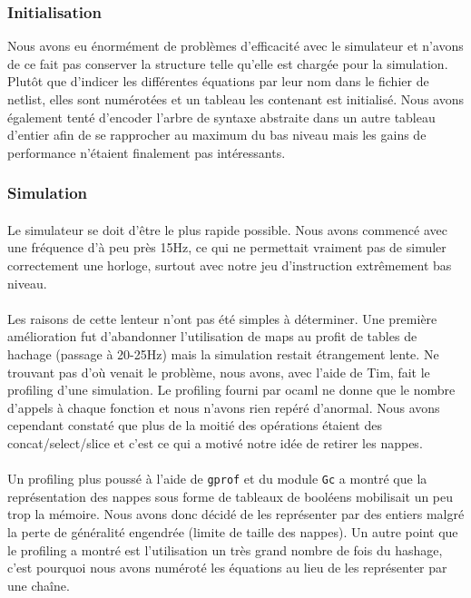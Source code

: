 \documentclass{article}
\begin{document}
\subsubsection{Initialisation}
Nous avons eu énormément de problèmes d'efficacité avec le simulateur et n'avons de ce fait pas conserver la structure telle qu'elle est chargée pour la simulation. Plutôt que d'indicer les différentes équations par leur nom dans le fichier de netlist, elles sont numérotées et un tableau les contenant est initialisé. Nous avons également tenté d'encoder l'arbre de syntaxe abstraite dans un autre tableau d'entier afin de se rapprocher au maximum du bas niveau mais les gains de performance n'étaient finalement pas intéressants.

\subsubsection{Simulation}
\paragraph{}Le simulateur se doit d'être le plus rapide possible. Nous avons commencé avec une fréquence d'à peu près 15Hz, ce qui ne permettait vraiment pas de simuler correctement une horloge, surtout avec notre jeu d'instruction extrêmement bas niveau.

\paragraph{}Les raisons de cette lenteur n'ont pas été simples à déterminer. Une première amélioration fut d'abandonner l'utilisation de maps au profit de tables de hachage (passage à 20-25Hz) mais la simulation restait étrangement lente. Ne trouvant pas d'où venait le problème, nous avons, avec l'aide de Tim, fait le profiling d'une simulation. Le profiling fourni par ocaml ne donne que le nombre d'appels à chaque fonction et nous n'avons rien repéré d'anormal. Nous avons cependant constaté que plus de la moitié des opérations étaient des concat/select/slice et c'est ce qui a motivé notre idée de retirer les nappes.

\paragraph{}Un profiling plus poussé à l'aide de \texttt{gprof} et du module \texttt{Gc} a montré que la représentation des nappes sous forme de tableaux de booléens mobilisait un peu trop la mémoire. Nous avons donc décidé de les représenter par des entiers malgré la perte de généralité engendrée (limite de taille des nappes). Un autre point que le profiling a montré est l'utilisation un très grand nombre de fois du hashage, c'est pourquoi nous avons numéroté les équations au lieu de les représenter par une chaîne.
\end{document}
